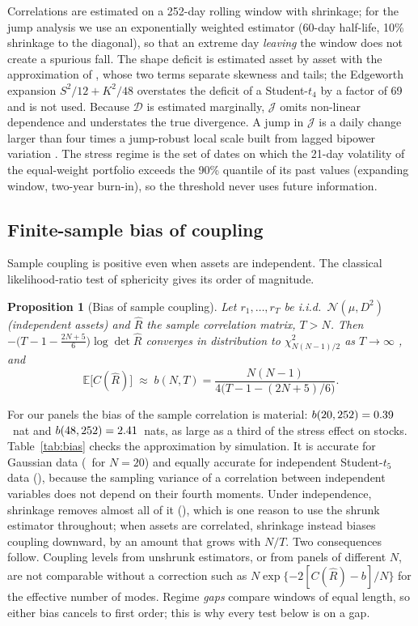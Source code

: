 \documentclass[12pt]{article}
\newtheorem{proposition}{Proposition}
\theoremstyle{definition}
\theoremstyle{remark}
\newcommand{\JJ}{\mathcal{J}}
\newcommand{\DD}{\mathcal{D}}
\newcommand{\E}{\mathbb{E}}
\begin{document}
\begin{doublespace}
Correlations are estimated on a 252-day rolling window with
\citet{ledoit2004} shrinkage; for the jump analysis we use an exponentially
weighted estimator (60-day half-life, 10\% shrinkage to the diagonal), so that
an extreme day \emph{leaving} the window does not create a spurious fall. The
shape deficit is estimated asset by asset with the approximation of
\citet{hyvarinen1998}, whose two terms separate skewness and tails; the
Edgeworth expansion $S^2/12+K^2/48$ overstates the deficit of a Student-$t_4$
by a factor of 69 and is not used. Because $\DD$ is estimated marginally, $\JJ$
omits non-linear dependence and understates the true divergence. A jump in
$\JJ$ is a daily change larger than four times a jump-robust local scale built
from lagged bipower variation \citep{bns2004}. The stress regime is the set of
dates on which the 21-day volatility of the equal-weight portfolio exceeds the
90\% quantile of its past values (expanding window, two-year burn-in), so the
threshold never uses future information.

\subsection{Finite-sample bias of coupling}

Sample coupling is positive even when assets are independent. The classical
likelihood-ratio test of sphericity gives its order of magnitude.

\begin{proposition}[Bias of sample coupling]
\label{prop:bias}
Let $r_1,\dots,r_T$ be i.i.d.\ $\mathcal N(\mu,D^2)$ (independent assets) and
$\hat R$ the sample correlation matrix, $T>N$. Then
$-\bigl(T-1-\tfrac{2N+5}{6}\bigr)\log\det\hat R$ converges in distribution to
$\chi^2_{N(N-1)/2}$ as $T\to\infty$ \citep{bartlett1950}, and
\begin{equation}
\label{eq:bias}
\E\bigl[C(\hat R)\bigr]\;\approx\;b(N,T)=\frac{N(N-1)}{4\bigl(T-1-(2N+5)/6\bigr)}.
\end{equation}
\end{proposition}

For our panels the bias of the sample correlation is material:
$b(20,252)=0.39$~nat and $b(48,252)=2.41$~nats,
as large as a third of the stress effect on stocks. Table~\ref{tab:bias}
checks the approximation by simulation. It is accurate for Gaussian data
(\biasTwentyRaw\ for $N=20$) and equally accurate for independent
Student-$t_5$ data (\biasTwentyT), because the sampling variance of a
correlation between independent variables does not depend on their fourth
moments. Under independence, \citet{ledoit2004} shrinkage removes almost all of
it (\biasTwentyLW), which is one reason to use the shrunk estimator throughout;
when assets are correlated, shrinkage instead biases coupling downward, by an
amount that grows with $N/T$. Two consequences follow. Coupling levels from
unshrunk estimators, or from panels of different $N$, are not comparable
without a correction such as $N\exp\{-2[C(\hat R)-b]/N\}$ for the effective
number of modes. Regime \emph{gaps} compare windows of equal length, so either
bias cancels to first order; this is why every test below is on a gap.


\end{doublespace}
\end{document}
